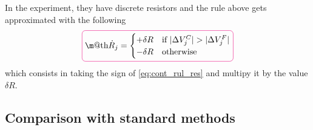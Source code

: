 \documentclass[11pt]{article}
\makeatletter
\newcommand*{\boxcolor}{RubineRed}
\renewcommand{\boxed}[1]{\textcolor{\boxcolor}{%
    \tikz[baseline={([yshift=-1ex]current bounding box.center)}] \node [rectangle, minimum width=1ex,rounded corners,draw] {\normalcolor\m@th$\displaystyle#1$};}}
\makeatother
\begin{document}
In the experiment, they have discrete resistors and the rule above gets approximated with the following 
\begin{equation}
\boxed{\dot{R}_j = \begin{cases} 
    +\delta R & \text{if} \ |\Delta V^{C}_{j}|>|\Delta V^{F}_{j}| \\
    -\delta R & \text{otherwise}
 \end{cases}}
\label{eq:disc_rul_res}
\end{equation}
which consists in taking the sign of \cref{eq:cont_rul_res} and multipy it by the value $\delta R$.

\subsection{Comparison with standard methods}
\end{document}
